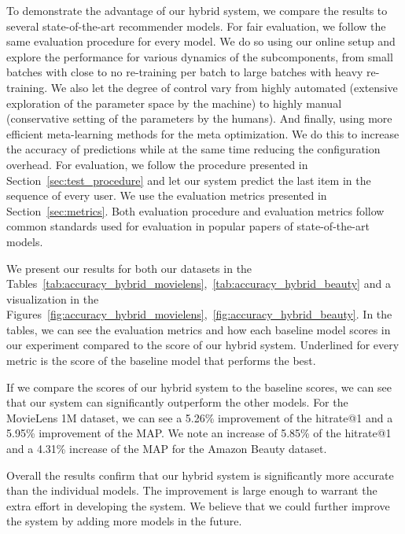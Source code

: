 To demonstrate the advantage of our hybrid system, we compare the results to several state-of-the-art recommender models. For fair evaluation, we follow the same evaluation procedure for every model. 
We do so using our online setup and explore the performance for various dynamics of the subcomponents, from small batches with close to no re-training per batch to large batches with heavy re-training. We also let the degree of control vary from highly automated (extensive exploration of the parameter space by the machine) to highly manual (conservative setting of the parameters by the humans). And finally, using more efficient meta-learning methods for the meta optimization. We do this to increase the accuracy of predictions while at the same time reducing the configuration overhead. For evaluation, we follow the procedure presented in Section~\ref{sec:test_procedure} and let our system predict the last item in the sequence of every user. We use the evaluation metrics presented in Section~\ref{sec:metrics}. Both evaluation procedure and evaluation metrics follow common standards used for evaluation in popular papers of state-of-the-art models. 

We present our results for both our datasets in the Tables~\ref{tab:accuracy_hybrid_movielens},~\ref{tab:accuracy_hybrid_beauty} and a visualization in the Figures~\ref{fig:accuracy_hybrid_movielens},~\ref{fig:accuracy_hybrid_beauty}. In the tables, we can see the evaluation metrics and how each baseline model scores in our experiment compared to the score of our hybrid system. Underlined for every metric is the score of the baseline model that performs the best. 

If we compare the scores of our hybrid system to the baseline scores, we can see that our system can significantly outperform the other models. For the MovieLens 1M dataset, we can see a 5.26\% improvement of the hitrate@1 and a 5.95\% improvement of the MAP. We note an increase of 5.85\% of the hitrate@1 and a 4.31\% increase of the MAP for the Amazon Beauty dataset. 

Overall the results confirm that our hybrid system is significantly more accurate than the individual models. The improvement is large enough to warrant the extra effort in developing the system. We believe that we could further improve the system by adding more models in the future.


